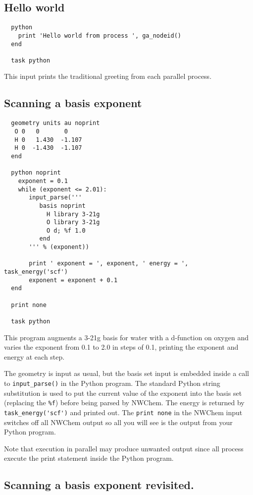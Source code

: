 \subsection{Hello world}

\begin{verbatim}
  python
    print 'Hello world from process ', ga_nodeid()
  end

  task python
\end{verbatim}

This input prints the traditional greeting from each parallel process.

\subsection{Scanning a basis exponent}
\begin{verbatim}
  geometry units au noprint
   O 0   0       0
   H 0   1.430  -1.107
   H 0  -1.430  -1.107
  end

  python noprint
    exponent = 0.1
    while (exponent <= 2.01):
       input_parse('''
          basis noprint
            H library 3-21g
            O library 3-21g
            O d; %f 1.0
          end
       ''' % (exponent))

       print ' exponent = ', exponent, ' energy = ', task_energy('scf')
       exponent = exponent + 0.1
  end

  print none

  task python
\end{verbatim}

This program augments a 3-21g basis for water with a d-function on
oxygen and varies the exponent from 0.1 to 2.0 in steps of 0.1,
printing the exponent and energy at each step.  

The geometry is input as usual, but the basis set input is embedded
inside a call to \verb+input_parse()+ in the Python program.  The
standard Python string substitution is used to put the current value of
the exponent into the basis set (replacing the \verb+%f+) before being
parsed by NWChem.  The energy is returned by \verb+task_energy('scf')+
and printed out.  The \verb+print none+ in the NWChem input switches
off all NWChem output so all you will see is the output from your
Python program.

Note that execution in parallel may produce unwanted output since
all process execute the print statement inside the Python program.

\subsection{Scanning a basis exponent revisited.}

